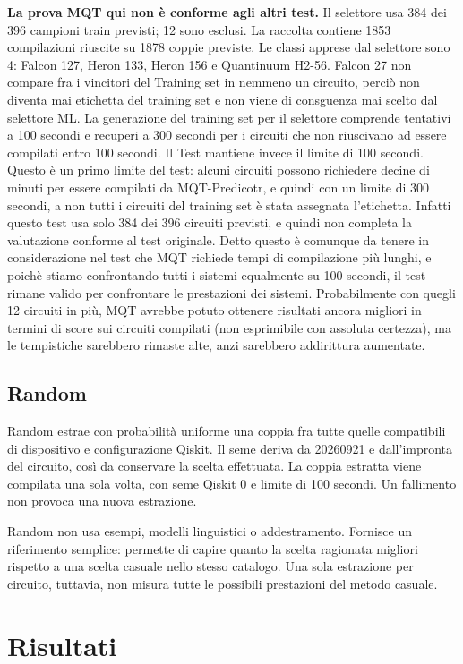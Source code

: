\textbf{La prova MQT qui non è conforme agli altri test.} Il selettore usa 384 dei 396 campioni train previsti; 12 sono esclusi. La raccolta contiene 1853 compilazioni riuscite su 1878 coppie previste. Le classi apprese dal selettore sono 4: Falcon 127, Heron 133, Heron 156 e Quantinuum H2-56. Falcon 27 non compare fra i vincitori del Training set in nemmeno un circuito, perciò non diventa mai etichetta del training set e non viene di consguenza mai scelto dal selettore ML. La generazione del training set per il selettore comprende tentativi a 100 secondi e recuperi a 300 secondi per i circuiti che non riuscivano ad essere compilati entro 100 secondi.
Il Test mantiene invece il limite di 100 secondi.
Questo è un primo limite del test: alcuni circuiti possono richiedere decine di minuti per essere compilati da MQT-Predicotr, e quindi con un limite di 300 secondi, a non tutti i circuiti del training set è stata assegnata l'etichetta.
Infatti questo test usa solo 384 dei 396 circuiti previsti, e quindi non completa la valutazione conforme al test originale.
Detto questo è comunque da tenere in considerazione nel test che MQT richiede tempi di compilazione più lunghi, e poichè stiamo confrontando tutti i sistemi equalmente su 100 secondi, il test rimane valido per confrontare le prestazioni dei sistemi.
Probabilmente con quegli 12 circuiti in più, MQT avrebbe potuto ottenere risultati ancora migliori in termini di score sui circuiti compilati (non esprimibile con assoluta certezza), ma le tempistiche sarebbero rimaste alte, anzi sarebbero addirittura aumentate.


\subsection{Random}
Random estrae con probabilità uniforme una coppia fra tutte quelle compatibili
di dispositivo e configurazione Qiskit. Il seme deriva da 20260921 e
dall'impronta del circuito, così da conservare la scelta effettuata.
La coppia estratta viene compilata una sola volta, con seme Qiskit 0
e limite di 100 secondi. Un fallimento non provoca una nuova estrazione.

Random non usa esempi, modelli linguistici o addestramento.
Fornisce un riferimento semplice: permette di capire quanto la scelta
ragionata migliori rispetto a una scelta casuale nello stesso catalogo.
Una sola estrazione per circuito, tuttavia, non misura tutte le possibili
prestazioni del metodo casuale.

\clearpage\section{Risultati}

